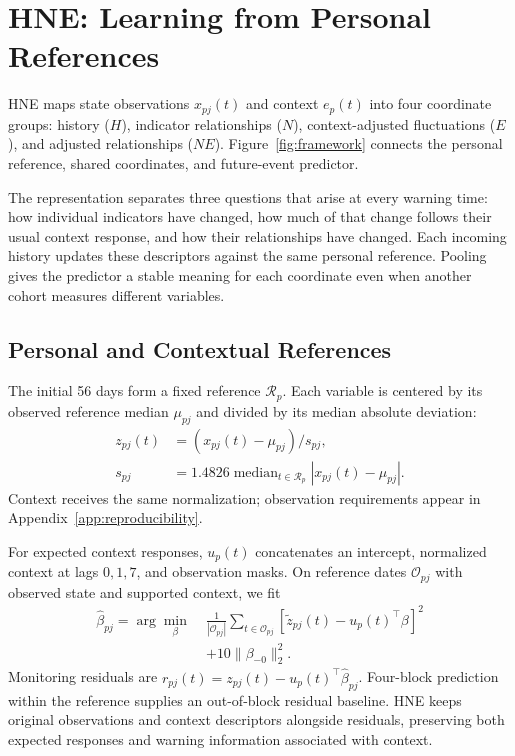 \section{HNE: Learning from Personal References}
\label{sec:method}

HNE maps state observations $x_{pj}(t)$ and context $e_p(t)$ into four coordinate groups: history ($H$), indicator relationships ($N$), context-adjusted fluctuations ($E$), and adjusted relationships ($NE$). Figure~\ref{fig:framework} connects the personal reference, shared coordinates, and future-event predictor.

The representation separates three questions that arise at every warning time: how individual indicators have changed, how much of that change follows their usual context response, and how their relationships have changed. Each incoming history updates these descriptors against the same personal reference. Pooling gives the predictor a stable meaning for each coordinate even when another cohort measures different variables.

\subsection{Personal and Contextual References}
\label{sec:reference}

The initial 56 days form a fixed reference $\mathcal R_p$. Each variable is centered by its observed reference median $\mu_{pj}$ and divided by its median absolute deviation:
\begin{equation}
\begin{aligned}
z_{pj}(t)&=(x_{pj}(t)-\mu_{pj})/s_{pj},\\
s_{pj}&=1.4826\operatorname{median}_{t\in\mathcal R_p}|x_{pj}(t)-\mu_{pj}|.
\end{aligned}
\end{equation}
Context receives the same normalization; observation requirements appear in Appendix~\ref{app:reproducibility}.

For expected context responses, $u_p(t)$ concatenates an intercept, normalized context at lags $0,1,7$, and observation masks. On reference dates $\mathcal O_{pj}$ with observed state and supported context, we fit
\begin{equation}
\begin{split}
\hat\beta_{pj}=\arg\min_\beta\;&\frac{1}{|\mathcal O_{pj}|}
\sum_{t\in\mathcal O_{pj}}[\tilde z_{pj}(t)-u_p(t)^\top\beta]^2\\
&+10\|\beta_{-0}\|_2^2.
\end{split}
\end{equation}
Monitoring residuals are $r_{pj}(t)=z_{pj}(t)-u_p(t)^\top\hat\beta_{pj}$. Four-block prediction within the reference supplies an out-of-block residual baseline. HNE keeps original observations and context descriptors alongside residuals, preserving both expected responses and warning information associated with context.

